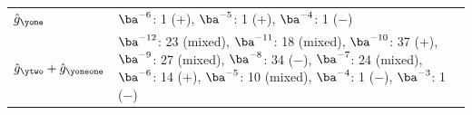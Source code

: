 \begin{center}
\begin{tabular}{lp{11.5cm}}
\toprule
$\hat g_{\yone}$ & $\ba^{-6}$: 1 (+), $\ba^{-5}$: 1 (+), $\ba^{-4}$: 1 (−) \\
$\hat g_{\ytwo} + \hat g_{\yoneone}$ & $\ba^{-12}$: 23 (mixed), $\ba^{-11}$: 18 (mixed), $\ba^{-10}$: 37 (+), $\ba^{-9}$: 27 (mixed), $\ba^{-8}$: 34 (−), $\ba^{-7}$: 24 (mixed), $\ba^{-6}$: 14 (+), $\ba^{-5}$: 10 (mixed), $\ba^{-4}$: 1 (−), $\ba^{-3}$: 1 (−) \\
\bottomrule
\end{tabular}
\end{center}
